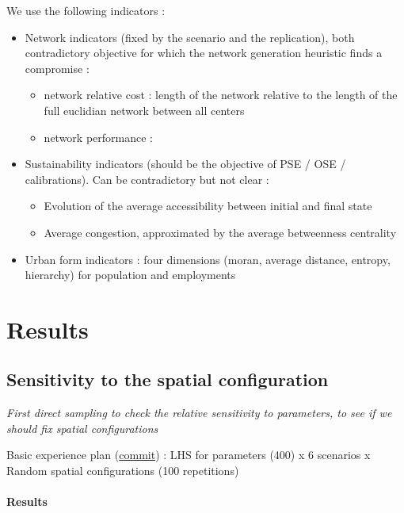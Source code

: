 We use the following indicators :
\begin{itemize}
	\item Network indicators (fixed by the scenario and the replication), both contradictory objective for which the network generation heuristic finds a compromise :
	\begin{itemize}
		\item network relative cost : length of the network relative to the length of the full euclidian network between all centers
		\item network performance : \cite{banos2012towards}
	\end{itemize}
	\item Sustainability indicators (should be the objective of PSE / OSE / calibrations). Can be contradictory but not clear :
	\begin{itemize}
		\item Evolution of the average accessibility between initial and final state
		\item Average congestion, approximated by the average betweenness centrality
	\end{itemize}
	\item Urban form indicators : four dimensions (moran, average distance, entropy, hierarchy) \cite{2017arXiv170806743R} for population and employments
\end{itemize}


\section{Results}


\subsection{Sensitivity to the spatial configuration}

\textit{First direct sampling to check the relative sensitivity to parameters, to see if we should fix spatial configurations}

Basic experience plan (\href{https://github.com/JusteRaimbault/Governance/commit/8f848a20abca8c51b927e18c1aaf1ad3434af2cb}{commit}) :
LHS for parameters (400) x 6 scenarios x Random spatial configurations (100 repetitions)


\paragraph{Results}














